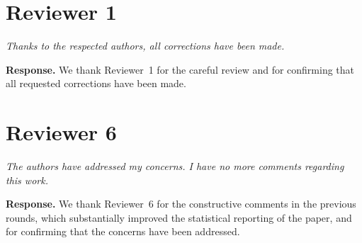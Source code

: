 \documentclass[11pt]{article}
\newenvironment{rcomment}{\par\noindent\begin{minipage}{\linewidth}\itshape\color{black!75}}{\end{minipage}\par}
\begin{document}
\section*{Reviewer 1}

\begin{rcomment}
Thanks to the respected authors, all corrections have been made.
\end{rcomment}

\textbf{Response.} We thank Reviewer~1 for the careful review and for
confirming that all requested corrections have been made.

\section*{Reviewer 6}

\begin{rcomment}
The authors have addressed my concerns. I have no more comments regarding this
work.
\end{rcomment}

\textbf{Response.} We thank Reviewer~6 for the constructive comments in the
previous rounds, which substantially improved the statistical reporting of the
paper, and for confirming that the concerns have been addressed.
\end{document}
